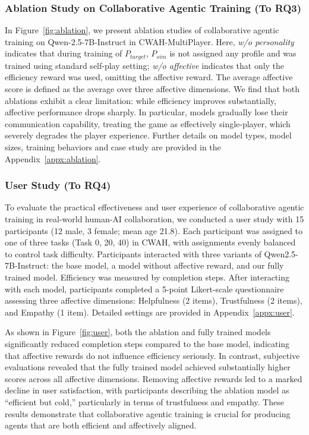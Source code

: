 \documentclass{article}
\theoremstyle{plain}
\theoremstyle{definition}
\theoremstyle{remark}
\begin{document}
\subsubsection{Ablation Study on Collaborative Agentic Training (To RQ3)}\label{sec:ablation} In Figure~\ref{fig:ablation}, we present ablation studies of collaborative agentic training on Qwen-2.5-7B-Instruct in CWAH-MultiPlayer. Here, \emph{w/o personality} indicates that during training of $P_{target}$, $P_{sim}$ is not assigned any profile and was trained using standard self-play setting; \emph{w/o affective} indicates that only the efficiency reward was used, omitting the affective reward. The average affective score is defined as the average over three affective dimensions. We find that both ablations exhibit a clear limitation: while efficiency improves substantially, affective performance drops sharply. In particular, models gradually lose their communication capability, treating the game as effectively single-player, which severely degrades the player experience. Further details on model types, model sizes, training behaviors and case study are provided in the Appendix~\ref{appx:ablation}.

\subsubsection{User Study (To RQ4)}

To evaluate the practical effectiveness and user experience of collaborative agentic training in real-world human-AI collaboration, we conducted a user study with 15 participants (12 male, 3 female; mean age 21.8). Each participant was assigned to one of three tasks (Task 0, 20, 40) in CWAH, with assignments evenly balanced to control task difficulty. Participants interacted with three variants of Qwen2.5-7B-Instruct: the base model, a model without affective reward, and our fully trained model. Efficiency was measured by completion steps. After interacting with each model, participants completed a 5-point Likert-scale questionnaire assessing three affective dimensions: Helpfulness (2 items), Trustfulness (2 items), and Empathy (1 item). Detailed settings are provided in Appendix~\ref{appx:user}.

As shown in Figure~\ref{fig:user}, both the ablation and fully trained models significantly reduced completion steps compared to the base model, indicating that affective rewards do not influence efficiency seriously. In contrast, subjective evaluations revealed that the fully trained model achieved substantially higher scores across all affective dimensions. Removing affective rewards led to a marked decline in user satisfaction, with participants describing the ablation model as “efficient but cold,” particularly in terms of trustfulness and empathy. These results demonstrate that collaborative agentic training is crucial for producing agents that are both efficient and affectively aligned.
\end{document}
